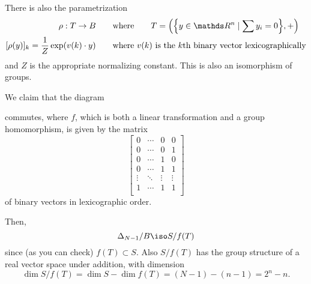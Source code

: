 \documentclass[11pt]{article}
\begin{document}
There is also the parametrization
\begin{align*}
    \rho : T \to B
    &\qquad\text{where}\qquad
    T = \pdil*{\cdil*{y \in \R^n \mid \sum y_i = 0}, +} \\
    [\rho(y)]_k = \frac 1 Z \exp\pdil*{ v(k) \cdot y}
    &\qquad\text{where $v(k)$ is the $k$th binary vector lexicographically}
\end{align*}
and $Z$ is the appropriate normalizing constant.  This is also an isomorphism of
groups.

We claim that the diagram
\begin{center}
\end{center}
commutes, where $f$, which is both a linear transformation and a group
homomorphism, is given by the matrix
\[
    \begin{bmatrix}
        0 & \cdots & 0 & 0 \\
        0 & \cdots & 0 & 1 \\
        0 & \cdots & 1 & 0 \\
        0 & \cdots & 1 & 1 \\
        \vdots  & \ddots & \vdots & \vdots \\
        1 & \cdots & 1 & 1 \\
    \end{bmatrix}
\]
of binary vectors in lexicographic order.

Then,
\[
    \Delta_{N-1} / B \iso S / f(T)
\]
since (as you can check)  $f(T) \subset S$.  Also $S / f(T)$ has the group
structure of a real vector space under addition, with dimension 
\[
    \dim S / f(T) = \dim S - \dim f(T) = (N-1) - (n-1) = 2^n - n.
\]
\end{document}
